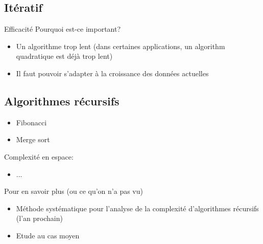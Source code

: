 \subsection{Itératif}

\begin{frame}{Efficacité}
Pourquoi est-ce important?
\begin{itemize}
\item Un algorithme trop lent (dans certaines applications, un algorithm quadratique est déjà trop lent)
\item Il faut pouvoir s'adapter à la croissance des données actuelles
\end{itemize}

\end{frame}







\subsection{Algorithmes récursifs}

\begin{frame}

\begin{itemize}
\item Fibonacci
\item Merge sort
\end{itemize}

\end{frame}

\begin{frame}
Complexité en espace:
\begin{itemize}
\item ...
\end{itemize}
\end{frame}

\begin{frame}{Pour en savoir plus (ou ce qu'on n'a pas vu)}

\begin{itemize}
\item Méthode systématique pour l'analyse de la complexité d'algorithmes récursifs (l'an prochain)
\item Etude au cas moyen
\end{itemize}

\end{frame}


